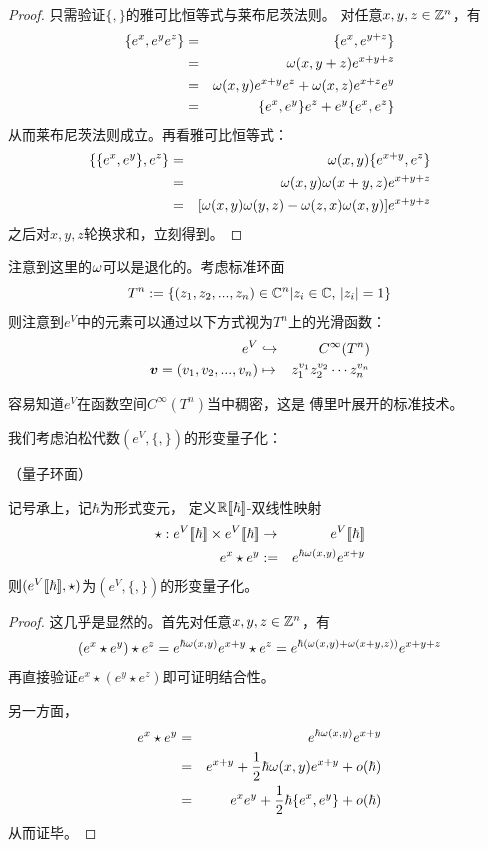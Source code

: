 \begin{proof}
只需验证$\{,\}$的雅可比恒等式与莱布尼茨法则。
对任意$x,y,z\in\mathbb{Z}^n$，有
\begin{eqnarray*}
     \{e^x,e^ye^z\}
&=&
     \{e^x,e^{y+z}\}\\
&=&
     \omega(x,y+z)e^{x+y+z}\\
&=&
     \omega(x,y)e^{x+y}e^z
    +\omega(x,z)e^{x+z}e^y\\
&=&
     \{e^x,e^y\}e^z
    +e^y\{e^x,e^z\}
\end{eqnarray*}
从而莱布尼茨法则成立。再看雅可比恒等式：
\begin{eqnarray*}
     \{\{e^x,e^y\},e^z\}
&=&
     \omega(x,y)\{e^{x+y},e^z\}\\
&=&
     \omega(x,y)\omega(x+y,z)e^{x+y+z}\\
&=&
     [\omega(x,y)\omega(y,z)-\omega(z,x)\omega(x,y)
     ]e^{x+y+z}
\end{eqnarray*}
之后对$x,y,z$轮换求和，立刻得到。
\end{proof}

注意到这里的$\omega$可以是退化的。考虑标准环面
$$T^{n}:=\{(z_1,z_2,...,z_n)\in\mathbb{C}^n|z_i\in\mathbb{C},\,|z_i|=1\}$$
则注意到$e^V$中的元素可以通过以下方式视为$T^n$上的光滑函数：
\begin{eqnarray*}
e^V&\hookrightarrow&C^{\infty}(T^n)\\
\boldsymbol{v}=(v_1,v_2,...,v_n)
&\mapsto&
z_1^{v_1}z_2^{v_2}\cdots z_n^{v_n}
\end{eqnarray*}

容易知道$e^V$在函数空间$C^{\infty}(T^n)$当中稠密，这是
傅里叶展开的标准技术。

我们考虑泊松代数$(e^V,\{,\})$的形变量子化：

\begin{prop}（量子环面）%

记号承上，记$\hbar$为形式变元，
定义$\mathbb{R}[\![\hbar]\!]$-双线性映射
\begin{eqnarray*}
\star : e^V[\![\hbar]\!]\times e^V[\![\hbar]\!] &\to& e^V[\![\hbar]\!]\\
e^x\star e^y &:=& e^{\hbar\omega(x,y)}e^{x+y}
\end{eqnarray*}
则$(e^V[\![\hbar]\!],\star)$为$(e^V,\{,\})$的形变量子化。
\end{prop}
\begin{proof}
这几乎是显然的。首先对任意$x,y,z\in\mathbb{Z}^n$，有
\begin{eqnarray*}
     (e^x\star e^y)\star e^z
=
     e^{\hbar\omega(x,y)}e^{x+y}\star e^z
=
     e^{\hbar(\omega(x,y)+\omega(x+y,z))}e^{x+y+z}
\end{eqnarray*}
再直接验证$e^x\star(e^y\star e^z)$即可证明结合性。

另一方面，
\begin{eqnarray*}
     e^x\star e^y
&=&
     e^{\hbar\omega(x,y)}e^{x+y}\\
&=&
     e^{x+y}+\frac{1}{2}\hbar\omega(x,y)e^{x+y}+o(\hbar)\\
&=&
     e^xe^y+\frac{1}{2}\hbar\{e^x,e^y\}+o(\hbar)
\end{eqnarray*}
从而证毕。
\end{proof}


